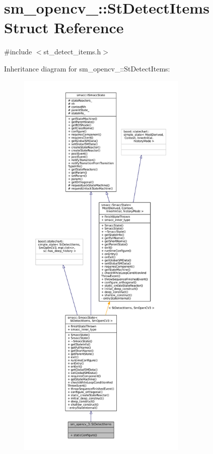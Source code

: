 \hypertarget{structsm__opencv__3_1_1StDetectItems}{}\section{sm\+\_\+opencv\+\_\+:\+:St\+Detect\+Items Struct Reference}
\label{structsm__opencv__3_1_1StDetectItems}


{\ttfamily \#include $<$st\+\_\+detect\+\_\+items.\+h$>$}



Inheritance diagram for sm\+\_\+opencv\+\_\+:\+:St\+Detect\+Items\+:
\nopagebreak
\begin{figure}[H]
\begin{center}
\leavevmode
\includegraphics[height=550pt]{structsm__opencv__3_1_1StDetectItems__inherit__graph}
\end{center}
\end{figure}


